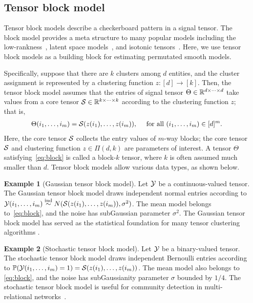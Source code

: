 \documentclass[12pt]{article}
\theoremstyle{definition}
\newtheorem{example}{Example}
\begin{document}
\subsection{Tensor block model}\label{subsec:bm}
Tensor block models describe a checkerboard pattern in a signal tensor. The block model provides a meta structure to many popular models including the low-rankness~\citep{young2018universality}, latent space models~\citep{wang2018learning}, and isotonic tensors~\citep{pananjady2020isotonic}. Here, we use tensor block models as a building block for estimating permutated smooth models. 

Specifically, suppose that there are $k$ clusters among $d$ entities, and the cluster assignment is represented by a clustering function $z \colon[d]\rightarrow[k]$. Then, the tensor block model assumes that the entries of signal tensor $\Theta\in\mathbb{R}^{d\times \cdots \times d}$ take values from a core tensor $\mathcal{S}\in\mathbb{R}^{k\times\cdots\times k}$ according to the clustering function $z$; that is,
\begin{align}\label{eq:block}
    \Theta(i_1,\ldots,i_m) = \mathcal{S}(z(i_1),\ldots,z(i_m)), \quad \text{ for all } (i_1,\ldots,i_m)\in[d]^m.
\end{align}
Here, the core tensor $\mathcal{S}$ collects the entry values of $m$-way blocks; the core tensor $\mathcal{S}$ and clustering function $z\in \Pi(d,k)$ are parameters of interest. A tensor $\Theta$ satisfying~\eqref{eq:block} is called a block-$k$ tensor, where $k$ is often assumed much smaller than $d$. Tensor block models allow various data types, as shown below. 

\begin{example}[Gaussian tensor block model] Let $\mathcal{Y}$ be a continuous-valued tensor. The Gaussian tensor block model draws independent normal entries according to $\mathcal{Y}(i_1,\ldots,i_m)\stackrel{\text{ind}}{\sim} N(\mathcal{S}(z(i_1),\ldots,z(i_m)),\sigma^2)$. The mean model belongs to~\eqref{eq:block}, and the noise has subGaussian parameter $\sigma^2$. The Gaussian tensor block model has served as the statistical foundation for many tensor clustering algorithms \citep{wang2019multiway,han2020exact}.
\end{example}

\begin{example}[Stochastic tensor block model] Let $\mathcal{Y}$ be a binary-valued tensor. The stochastic tensor block model draws independent Bernoulli entries according to $\mathbb{P}(\mathcal{Y}(i_1,\ldots,i_m)=1)=\mathcal{S}(z(i_1),\ldots,z(i_m))$. The mean model also belongs to \eqref{eq:block}, and the noise has subGaussianity parameter $\sigma$ bounded by $1/4$.  
The stochastic tensor block model is useful for community detection in multi-relational networks~\citep{bickel2009nonparametric,gao2015rate}.
\end{example}
\end{document}
